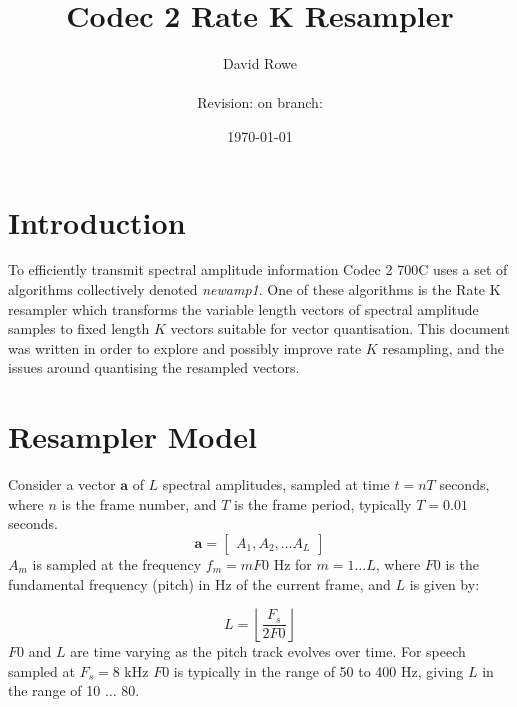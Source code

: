 \documentclass{article}
\title{Codec 2 Rate K Resampler}
\author{David Rowe\\ \\ Revision: {\gitrevision} on branch: {\branch}}
\date{\today}
\begin{document}
\maketitle

\section{Introduction}

To efficiently transmit spectral amplitude information Codec 2 700C uses a set of algorithms collectively denoted \emph{newamp1}. One of these algorithms is the Rate K resampler which transforms the variable length vectors of spectral amplitude samples to fixed length $K$ vectors suitable for vector quantisation.  This document was written in order to explore and possibly improve rate $K$ resampling, and the issues around quantising the resampled vectors.

\section{Resampler Model}

Consider a vector $\mathbf{a}$ of $L$ spectral amplitudes, sampled at time $t=nT$ seconds, where $n$ is the frame number, and $T$ is the frame period, typically $T=0.01$ seconds. 
\begin{equation}
\mathbf{a} = \begin{bmatrix} A_1, A_2, \ldots A_L \end{bmatrix} 
\end{equation}
$A_m$ is sampled at the frequency $f_m=mF0$ Hz for $m=1 \ldots L$, where $F0$ is the fundamental frequency (pitch) in Hz of the current frame, and $L$ is given by:

\begin{equation}
L=\left \lfloor \frac{F_s}{2F0} \right \rfloor
\end{equation}
$F0$ and $L$ are time varying as the pitch track evolves over time. For speech sampled at $F_s=8$ kHz $F0$ is typically in the range of 50 to 400 Hz, giving $L$ in the range of 10 $\ldots$ 80. \\
\end{document}
